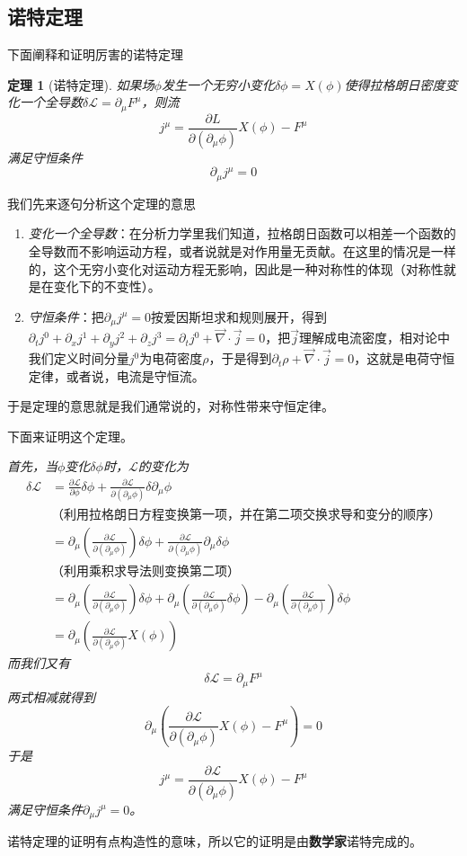 \documentclass[a4paper,11pt]{ctexart}
\newcommand{\beq}{\begin{equation}}
\newcommand{\eeq}{\end{equation}}
\newcommand{\bea}{\begin{equation}\begin{aligned}}
\newcommand{\eea}{\end{aligned}\end{equation}}
\newcommand{\lag}{\mathcal{L}}
\newtheorem{thm}{定理}[section]
\begin{document}
\subsection{诺特定理}
下面阐释和证明厉害的诺特定理
\begin{thm}[诺特定理]
如果场$\phi$发生一个无穷小变化$\delta \phi = X(\phi)$使得拉格朗日密度变化一个全导数$\delta \lag = \partial_\mu F^\mu$，则流
\beq
j^\mu = \frac{\partial L}{\partial(\partial_\mu \phi)}X(\phi) - F^\mu
\eeq
满足守恒条件
\beq
\partial_\mu j^\mu = 0
\eeq
\end{thm}
我们先来逐句分析这个定理的意思
\begin{enumerate}
\item \emph{变化一个全导数}：在分析力学里我们知道，拉格朗日函数可以相差一个函数的全导数而不影响运动方程，或者说就是对作用量无贡献。在这里的情况是一样的，这个无穷小变化对运动方程无影响，因此是一种对称性的体现（对称性就是在变化下的不变性）。
\item \emph{守恒条件}：把$\partial_\mu j^\mu = 0$按爱因斯坦求和规则展开，得到$\partial_t j^0 + \partial_x j^1 + \partial_y j^2 + \partial_z j^3 = \partial_t j^0 + \vec{\nabla} \cdot \vec{j} = 0$，把$\vec{j}$理解成电流密度，相对论中我们定义时间分量$j^0$为电荷密度$\rho$，于是得到$\partial_t \rho + \vec{\nabla} \cdot \vec{j} = 0$，这就是电荷守恒定律，或者说，电流是守恒流。
\end{enumerate}
于是定理的意思就是我们通常说的，对称性带来守恒定律。
\par
下面来证明这个定理。\par
\emph{首先，当$\phi$变化$\delta \phi$时，$\lag$的变化为
\bea
\delta \lag &= \frac{\partial \lag}{\partial \phi} \delta \phi + \frac{\partial \lag}{\partial (\partial_\mu \phi)} \delta \partial_\mu \phi \\
&\text{（利用拉格朗日方程变换第一项，并在第二项交换求导和变分的顺序）} \\
& = \partial_\mu (\frac{\partial \lag}{\partial (\partial_\mu \phi)}) \delta \phi +  \frac{\partial \lag}{\partial (\partial_\mu \phi)} \partial_\mu \delta \phi \\
&\text{（利用乘积求导法则变换第二项）}\\
&=  \partial_\mu (\frac{\partial \lag}{\partial (\partial_\mu \phi)}) \delta \phi + \partial_\mu( \frac{\partial \lag}{\partial (\partial_\mu \phi)} \delta \phi) - \partial_\mu( \frac{\partial \lag}{\partial (\partial_\mu \phi)})\delta \phi \\
&= \partial_\mu( \frac{\partial \lag}{\partial (\partial_\mu \phi)} X(\phi))
\eea
而我们又有
\beq
\delta \lag = \partial_\mu F^\mu
\eeq
两式相减就得到
\beq
\partial_\mu( \frac{\partial \lag}{\partial (\partial_\mu \phi)} X(\phi) - F^\mu) = 0
\eeq
于是
\beq
j^\mu = \frac{\partial \lag}{\partial (\partial_\mu \phi)} X(\phi) - F^\mu
\eeq
满足守恒条件$\partial_\mu j^\mu = 0$。}
\par
诺特定理的证明有点构造性的意味，所以它的证明是由\textbf{数学家}诺特完成的。
\end{document}
